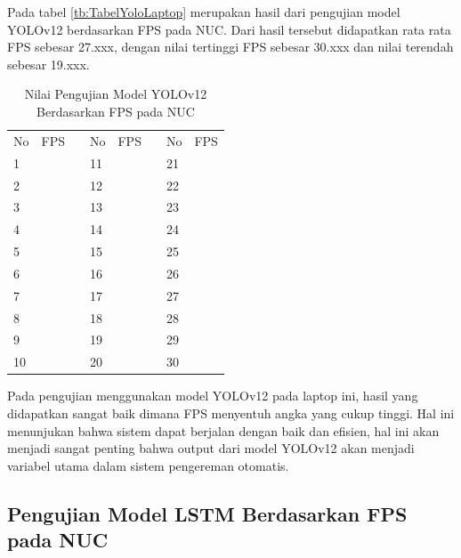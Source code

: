 Pada tabel \ref{tb:TabelYoloLaptop} merupakan hasil dari pengujian model YOLOv12 berdasarkan FPS pada NUC. Dari hasil tersebut didapatkan rata rata FPS sebesar 27.xxx, dengan nilai tertinggi FPS sebesar 30.xxx dan nilai terendah sebesar 19.xxx.

\begin{table}[H]
  \centering
  \caption{Nilai Pengujian Model YOLOv12 Berdasarkan FPS pada NUC} 
  \label{tb:TabelYolov12Nuc}
  \begin{tabular}{|l|l|l|l|l|l|l|l|}
  \cline{1-2} \cline{4-5} \cline{7-8}
  No & FPS &  & No & FPS &  & No & FPS \\ \cline{1-2} \cline{4-5} \cline{7-8} 
  1  &     &  & 11 &     &  & 21 &     \\ \cline{1-2} \cline{4-5} \cline{7-8} 
  2  &     &  & 12 &     &  & 22 &     \\ \cline{1-2} \cline{4-5} \cline{7-8} 
  3  &     &  & 13 &     &  & 23 &     \\ \cline{1-2} \cline{4-5} \cline{7-8} 
  4  &     &  & 14 &     &  & 24 &     \\ \cline{1-2} \cline{4-5} \cline{7-8} 
  5  &     &  & 15 &     &  & 25 &     \\ \cline{1-2} \cline{4-5} \cline{7-8} 
  6  &     &  & 16 &     &  & 26 &     \\ \cline{1-2} \cline{4-5} \cline{7-8} 
  7  &     &  & 17 &     &  & 27 &     \\ \cline{1-2} \cline{4-5} \cline{7-8} 
  8  &     &  & 18 &     &  & 28 &     \\ \cline{1-2} \cline{4-5} \cline{7-8} 
  9  &     &  & 19 &     &  & 29 &     \\ \cline{1-2} \cline{4-5} \cline{7-8} 
  10 &     &  & 20 &     &  & 30 &     \\ \cline{1-2} \cline{4-5} \cline{7-8} 
  \end{tabular}
\end{table}

Pada pengujian menggunakan model YOLOv12 pada laptop ini, hasil yang didapatkan sangat baik dimana FPS menyentuh angka yang cukup tinggi. Hal ini menunjukan bahwa sistem dapat berjalan dengan baik dan efisien, hal ini akan menjadi sangat penting bahwa output dari model YOLOv12 akan menjadi variabel utama dalam sistem pengereman otomatis.

\subsection{Pengujian Model LSTM Berdasarkan FPS pada NUC}


